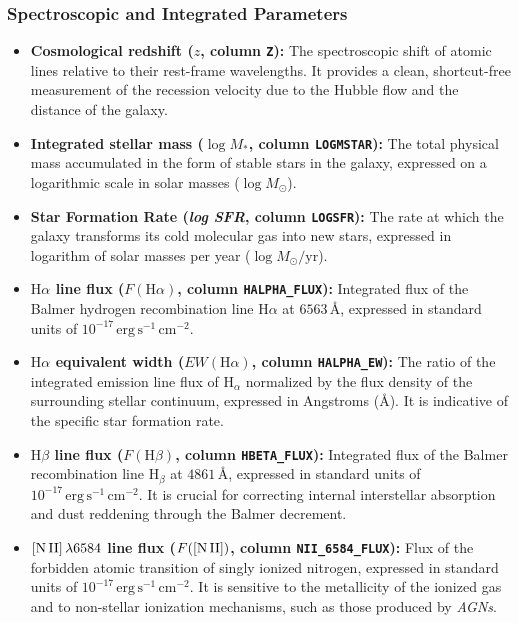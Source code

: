 \subsubsection{Spectroscopic and Integrated Parameters}

\begin{itemize}
	\item \textbf{Cosmological redshift ($z$, column \texttt{Z}):} The spectroscopic shift of atomic lines relative to their rest-frame wavelengths. It provides a clean, shortcut-free measurement of the recession velocity due to the Hubble flow and the distance of the galaxy.
	
	\item \textbf{Integrated stellar mass ($\log M_*$, column \texttt{LOGMSTAR}):} The total physical mass accumulated in the form of stable stars in the galaxy, expressed on a logarithmic scale in solar masses ($\log M_\odot$).
	
	\item \textbf{Star Formation Rate (\textit{log \gls{SFR}}, column \texttt{LOGSFR}):} The rate at which the galaxy transforms its cold molecular gas into new stars, expressed in logarithm of solar masses per year ($\log M_\odot/\text{yr}$).
	
	
	\item \textbf{$\text{H}\alpha$ line flux ($F(\text{H}\alpha)$, column \texttt{HALPHA\_FLUX}):} Integrated flux of the Balmer hydrogen recombination line $\text{H}\alpha$ at $6563\,\text{\AA{}}$, expressed in standard units of $10^{-17}\,\text{erg}\,\text{s}^{-1}\,\text{cm}^{-2}$.
	
	\item \textbf{$\text{H}\alpha$ equivalent width ($EW(\text{H}\alpha)$, column \texttt{HALPHA\_EW}):} The ratio of the integrated emission line flux of $\text{H}_\alpha$ normalized by the flux density of the surrounding stellar continuum, expressed in Angstroms ($\text{\AA{}}$). It is indicative of the specific star formation rate.
	
	\item \textbf{$\text{H}\beta$ line flux ($F(\text{H}\beta)$, column \texttt{HBETA\_FLUX}):} Integrated flux of the Balmer recombination line $\text{H}_\beta$ at $4861\,\text{\AA{}}$, expressed in standard units of $10^{-17}\,\text{erg}\,\text{s}^{-1}\,\text{cm}^{-2}$. It is crucial for correcting internal interstellar absorption and dust reddening through the Balmer decrement.
	
	\item \textbf{$[\text{N\,II}]\,\lambda 6584$ line flux ($F([\text{N\,II}])$, column \texttt{NII\_6584\_FLUX}):} Flux of the forbidden atomic transition of singly ionized nitrogen, expressed in standard units of $10^{-17}\,\text{erg}\,\text{s}^{-1}\,\text{cm}^{-2}$. It is sensitive to the metallicity of the ionized gas and to non-stellar ionization mechanisms, such as those produced by \textit{\glspl{AGN}}.
	

\end{itemize}
